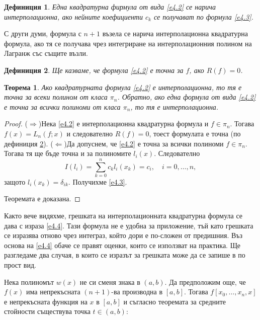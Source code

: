 \documentclass[12pt]{article}
\numberwithin{equation}{section}
\newtheorem{theorem}{Теорема}
\newtheorem{definition}{Дефиниция}
\numberwithin{theorem}{section}
\numberwithin{definition}{section}
\numberwithin{corollary}{section}
\begin{document}
\begin{definition}
Една квадратурна фирмула от вида \ref{e4.2} се нарича интерполационна, ако нейните коефициенти $c_k$ се получават по формула \ref{e4.3}.
\end{definition}
\par
С други думи, формула с $n+1$ възела се нарича интерполационна квадратурна формула, ако тя се получава чрез интегриране на интерполационния полином на Лагранж със същите възли.
\par
\begin{definition}\label{d4.2}
Ще казваме, че формула \ref{e4.2} е точна за $f$, ако $R(f) = 0$.
\end{definition}
\begin{theorem}\label{T4.1}
Ако квадратурната формула \ref{e4.2} е интерполационна, то тя е точна за всеки полином от класа $\pi_n$. Обратно, ако една формула от вида \ref{e4.2} е точна за всички полиноми от класа $\pi_n$, то тя е интерполационна.
\end{theorem}
\begin{proof}
($\Rightarrow$)\hspace{12pt}Нека \ref{e4.2} е интерполационна квадратурна формула и $f\in\pi_n$. Тогава $f(x)=L_n(f;x)$ и следователно $R(f) = 0$, тоест формулата е точна (по дефиниция \ref{d4.2}).
($\Leftarrow$)\hspace{12pt}Да допуснем, че \ref{e4.2} е точна за всички полиноми $f\in\pi_n$. Тогава тя ще бъде точна и за полиномите $l_i(x)$. Следователно
\[
I(l_i) = \displaystyle\sum_{k=0}^nc_kl_i(x_k)=c_i,\hspace{12pt}i=0,\dotso,n,
\]
защото $l_i(x_k)=\delta_{ik}$. Получихме \ref{e4.3}.
\par
Теоремата е доказана.
\end{proof}
\par
Както вече видяхме, грешката на интерполационната квадратурна формула се дава с израза \ref{e4.4}. Тази формула не е удобна за приложение, тъй като грешката се изразява отново чрез интеграз, който дори е по-сложен от предишния. Въз основа на \ref{e4.4} обаче се правят оценки, които се използват на практика. Ще разгледаме два случая, в които се изразът за грешката може да се запише в по прост вид.
\par
Нека полиномът $w(x)$ не си сменя знака в $(a,b)$. Да предположим още, че $f(x)$ има непрекъсната $(n+1)$-ва производна в $[a,b]$. Тогава $f[x_0,\dotso,x_n,x]$ е непрекъсната функция на $x$ в $[a,b]$ и съгласно теоремата за средните стойности съществува точка $t\in(a,b):$
\end{document}
